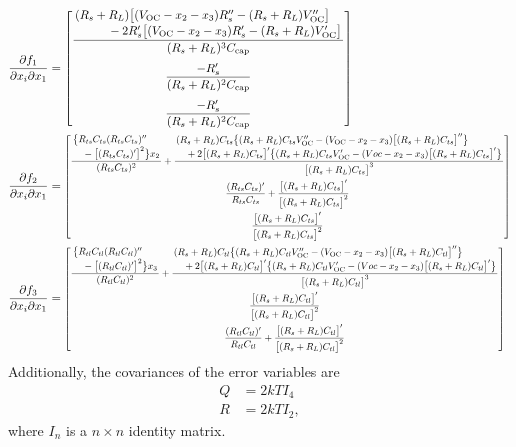 \documentclass[../zhang_thesis.tex]{subfiles}
\begin{document}
\begin{align}
    \frac{\partial f_1}{\partial x_i \partial x_1} & = \begin{bmatrix}
            \dfrac{\splitfrac{(R_s+R_L)\big[(V_\text{OC}-x_2-x_3)R_s''-(R_s+R_L)V_\text{OC}''\big]}{- 2R_s' \big[(V_\text{OC}-x_2-x_3)R_s' - (R_s+R_L)V_\text{OC}'\big]}}{(R_s+R_L)^3 C_\text{cap}} \\[3ex]
            \dfrac{-R_s'}{(R_s+R_L)^2 C_\text{cap}} \\[3ex]
            \dfrac{-R_s'}{(R_s+R_L)^2 C_\text{cap}}
        \end{bmatrix} \\
    \frac{\partial f_2}{\partial x_i \partial x_1} & = \scalemath{0.8}{ \begin{bmatrix}
            \dfrac{\splitfrac{\big\{R_{ts}C_{ts}(R_{ts}C_{ts})''}{- \big[(R_{ts}C_{ts})'\big]^2\big\}x_2}}{(R_{ts}C_{ts})^2} + \dfrac{\splitfrac{(R_s+R_L)C_{ts}\big\{(R_s+R_L)C_{ts}V_\text{OC}'' - (V_\text{OC}-x_2-x_3)\big[(R_s+R_L)C_{ts}\big]''\big\}}{+ 2 \big[(R_s+R_L)C_{ts}\big]' \big\{(R_s+R_L)C_{ts}V_\text{OC}' - (Voc-x_2-x_3)\big[(R_s+R_L)C_{ts}\big]'\big\}}}{\big[(R_s+R_L)C_{ts}\big]^3} \\[3ex]
            \dfrac{(R_{ts}C_{ts})'}{R_{ts}C_{ts}}+\dfrac{\big[(R_s+R_L)C_{ts}\big]'}{\big[(R_s+R_L)C_{ts}\big]^2} \\[3ex]
            \dfrac{\big[(R_s+R_L)C_{ts}\big]'}{\big[(R_s+R_L)C_{ts}\big]^2}
        \end{bmatrix} } \\
    \frac{\partial f_3}{\partial x_i \partial x_1} & = \scalemath{0.8}{ \begin{bmatrix}
            \dfrac{\splitfrac{\big\{R_{tl}C_{tl}(R_{tl}C_{tl})''}{- \big[(R_{tl}C_{tl})'\big]^2\big\}x_3}}{(R_{tl}C_{tl})^2} + \dfrac{\splitfrac{(R_s+R_L)C_{tl}\big\{(R_s+R_L)C_{tl}V_\text{OC}'' - (V_\text{OC}-x_2-x_3)\big[(R_s+R_L)C_{tl}\big]''\big\}}{+ 2 \big[(R_s+R_L)C_{tl}\big]' \big\{(R_s+R_L)C_{tl}V_\text{OC}' - (Voc-x_2-x_3)\big[(R_s+R_L)C_{tl}\big]'\big\}}}{\big[(R_s+R_L)C_{tl}\big]^3} \\[3ex]
            \dfrac{\big[(R_s+R_L)C_{tl}\big]'}{\big[(R_s+R_L)C_{tl}\big]^2} \\[3ex]
            \dfrac{(R_{tl}C_{tl})'}{R_{tl}C_{tl}}+\dfrac{\big[(R_s+R_L)C_{tl}\big]'}{\big[(R_s+R_L)C_{tl}\big]^2}
        \end{bmatrix} }
\end{align}
Additionally, the covariances of the error variables are
\begin{align}
    Q & = 2kT I_4 \\
    R & = 2kT I_2,
\end{align}
where $I_n$ is a $n\times n$ identity matrix.
\end{document}
